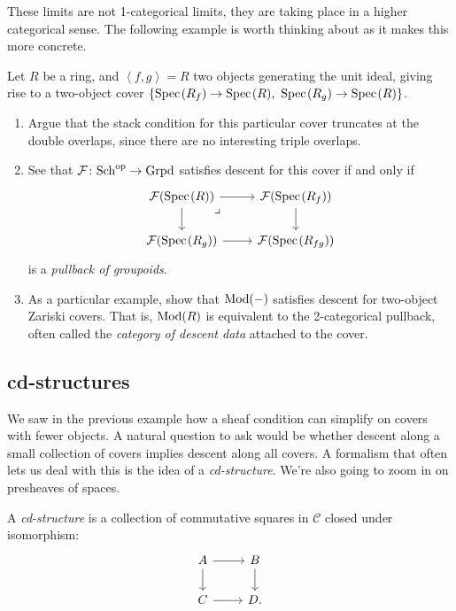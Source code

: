 \documentclass[11pt,openany]{book}
\begin{document}
\begin{remark} These limits are not 1-categorical limits, they are taking place in a higher categorical sense. The following example is worth thinking about as it makes this more concrete.
\end{remark}

\begin{example} Let $R$ be a ring, and $\left\langle f,g \right\rangle = R$ two objects generating the unit ideal, giving rise to a two-object cover $\left\{ \text{Spec}\hspace{0.1em}(R_f) \to \text{Spec}\hspace{0.1em}(R),\ \text{Spec}\hspace{0.1em}(R_g) \to \text{Spec}\hspace{0.1em}(R) \right\}$.
\begin{enumerate}
    \item Argue that the stack condition for this particular cover truncates at the double overlaps, since there are no interesting triple overlaps.
    \item See that $\mathcal{F} \colon \mathrm{Sch}^{\mathrm{op}} \to \mathrm{Grpd}$ satisfies descent for this cover if and only if
\[ \begin{tikzcd}
    \mathcal{F}(\Spec(R))\rar\dar\pb & \mathcal{F}(\Spec(R_f))\dar\\
    \mathcal{F}(\Spec(R_g))\rar & \mathcal{F}(\Spec(R_{fg}))
\end{tikzcd} \]
is a \textit{pullback of groupoids}.

    \item As a particular example, show that $\mathrm{Mod}(-)$ satisfies descent for two-object Zariski covers. That is, $\mathrm{Mod}(R)$ is equivalent to the 2-categorical pullback, often called the \textit{category of descent data} attached to the cover.
\end{enumerate}
\end{example}

\subsection{cd-structures} We saw in the previous example how a sheaf condition can simplify on covers with fewer objects. A natural question to ask would be whether descent along a small collection of covers implies descent along all covers. A formalism that often lets us deal with this is the idea of a \textit{cd-structure}. We're also going to zoom in on presheaves of spaces.

\begin{definition} A \textit{cd-structure} is a collection of commutative squares in $\mathscr{C}$ closed under isomorphism:
\[ \begin{tikzcd}
    A\rar\dar & B\dar\\
    C\rar & D.
\end{tikzcd} \]
\end{definition}
\end{document}
